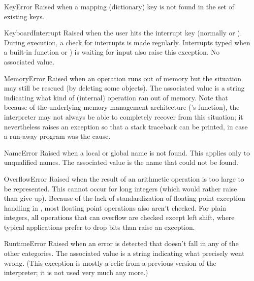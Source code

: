 \begin{excdesc}{KeyError}
  Raised when a mapping (dictionary) key is not found in the set of
  existing keys.
\end{excdesc}

\begin{excdesc}{KeyboardInterrupt}
  Raised when the user hits the interrupt key (normally
   or
).  During execution, a check for interrupts is made regularly.
  Interrupts typed when a built-in function  or
  ) is waiting for input also raise this exception.  No
  associated value.
\end{excdesc}

\begin{excdesc}{MemoryError}
  Raised when an operation runs out of memory but the situation may
  still be rescued (by deleting some objects).  The associated value is
  a string indicating what kind of (internal) operation ran out of memory.
  Note that because of the underlying memory management architecture
  (\C{}'s  function), the interpreter may not always be able
  to completely recover from this situation; it nevertheless raises an
  exception so that a stack traceback can be printed, in case a run-away
  program was the cause.
\end{excdesc}

\begin{excdesc}{NameError}
  Raised when a local or global name is not found.  This applies only
  to unqualified names.  The associated value is the name that could
  not be found.
\end{excdesc}

\begin{excdesc}{OverflowError}
  Raised when the result of an arithmetic operation is too large to be
  represented.  This cannot occur for long integers (which would rather
  raise  than give up).  Because of the lack of
  standardization of floating point exception handling in \C{}, most
  floating point operations also aren't checked.  For plain integers,
  all operations that can overflow are checked except left shift, where
  typical applications prefer to drop bits than raise an exception.
\end{excdesc}

\begin{excdesc}{RuntimeError}
  Raised when an error is detected that doesn't fall in any of the
  other categories.  The associated value is a string indicating what
  precisely went wrong.  (This exception is mostly a relic from a
  previous version of the interpreter; it is not used very much any
  more.)
\end{excdesc}

